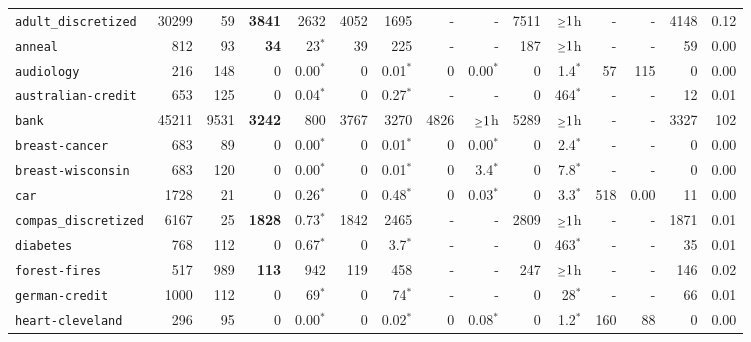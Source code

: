 \begin{tabular}{lccrrrrrrrrrrrr}
\texttt{adult\_discretized} & \multicolumn{1}{r}{30299} & \multicolumn{1}{r}{59}  & \textbf{3841} & 2632 & 4052 & 1695 & - & - & 7511 & $\mathsmaller{\geq}1$h & - & - & 4148 & 0.12\\
\texttt{anneal} & \multicolumn{1}{r}{812} & \multicolumn{1}{r}{93}  & \textbf{34} & 23$^*$ & 39 & 225 & - & - & 187 & $\mathsmaller{\geq}1$h & - & - & 59 & 0.00\\
\texttt{audiology} & \multicolumn{1}{r}{216} & \multicolumn{1}{r}{148}  & 0 & 0.00$^*$ & 0 & 0.01$^*$ & 0 & 0.00$^*$ & 0 & 1.4$^*$ & 57 & 115 & 0 & 0.00\\
\texttt{australian-credit} & \multicolumn{1}{r}{653} & \multicolumn{1}{r}{125}  & 0 & 0.04$^*$ & 0 & 0.27$^*$ & - & - & 0 & 464$^*$ & - & - & 12 & 0.01\\
\texttt{bank} & \multicolumn{1}{r}{45211} & \multicolumn{1}{r}{9531}  & \textbf{3242} & 800 & 3767 & 3270 & 4826 & $\mathsmaller{\geq}1$h & 5289 & $\mathsmaller{\geq}1$h & - & - & 3327 & 102\\
\texttt{breast-cancer} & \multicolumn{1}{r}{683} & \multicolumn{1}{r}{89}  & 0 & 0.00$^*$ & 0 & 0.01$^*$ & 0 & 0.00$^*$ & 0 & 2.4$^*$ & - & - & 0 & 0.00\\
\texttt{breast-wisconsin} & \multicolumn{1}{r}{683} & \multicolumn{1}{r}{120}  & 0 & 0.00$^*$ & 0 & 0.01$^*$ & 0 & 3.4$^*$ & 0 & 7.8$^*$ & - & - & 0 & 0.00\\
\texttt{car} & \multicolumn{1}{r}{1728} & \multicolumn{1}{r}{21}  & 0 & 0.26$^*$ & 0 & 0.48$^*$ & 0 & 0.03$^*$ & 0 & 3.3$^*$ & 518 & 0.00 & 11 & 0.00\\
\texttt{compas\_discretized} & \multicolumn{1}{r}{6167} & \multicolumn{1}{r}{25}  & \textbf{1828} & 0.73$^*$ & 1842 & 2465 & - & - & 2809 & $\mathsmaller{\geq}1$h & - & - & 1871 & 0.01\\
\texttt{diabetes} & \multicolumn{1}{r}{768} & \multicolumn{1}{r}{112}  & 0 & 0.67$^*$ & 0 & 3.7$^*$ & - & - & 0 & 463$^*$ & - & - & 35 & 0.01\\
\texttt{forest-fires} & \multicolumn{1}{r}{517} & \multicolumn{1}{r}{989}  & \textbf{113} & 942 & 119 & 458 & - & - & 247 & $\mathsmaller{\geq}1$h & - & - & 146 & 0.02\\
\texttt{german-credit} & \multicolumn{1}{r}{1000} & \multicolumn{1}{r}{112}  & 0 & 69$^*$ & 0 & 74$^*$ & - & - & 0 & 28$^*$ & - & - & 66 & 0.01\\
\texttt{heart-cleveland} & \multicolumn{1}{r}{296} & \multicolumn{1}{r}{95}  & 0 & 0.00$^*$ & 0 & 0.02$^*$ & 0 & 0.08$^*$ & 0 & 1.2$^*$ & 160 & 88 & 0 & 0.00\\

\end{tabular}

